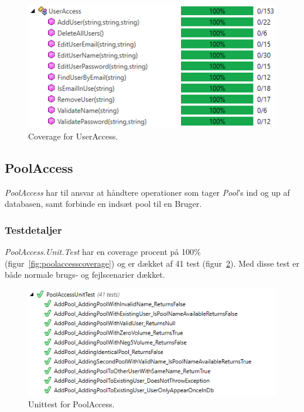 \begin{figure}[h]
	\centering
	\includegraphics[width=0.7\linewidth]{figs/test/useraccesscoverage}
	\caption{Coverage for UserAccess.}
	\label{fig:useraccesscoverage}
\end{figure} 


\subsection{PoolAccess}
\textit{PoolAccess} har til ansvar at håndtere operationer som tager \textit{Pool}'s ind og up af databasen, samt forbinde en indsæt pool til en Bruger. 

\subsubsection{Testdetaljer}
\textit{PoolAccess.Unit.Test} har en coverage procent på 100\% (figur~\ref{fig:poolaccesscoverage}) og er dækket af 41 test (figur~\ref{fig:poolaccessunittest}). Med disse test er både normale brugs- og fejlscenarier dækket.

\begin{figure}[h]
	\centering
	\includegraphics[width=0.8\linewidth]{figs/test/poolaccessunittest}
	\caption{Unittest for PoolAccess.}
	\label{fig:poolaccessunittest}
\end{figure}

